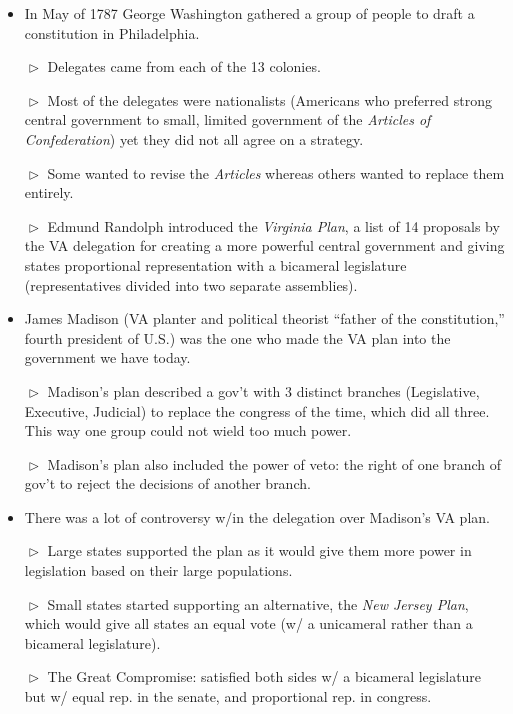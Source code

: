 \documentclass[10pt]{article}
\begin{document}
\begin{flushleft}

\begin{multicols}{2}

\begin{itemize}
\item In May of 1787 George Washington gathered a group of people to draft a constitution in Philadelphia.
\item[$\vartriangleright$] Delegates came from each of the 13 colonies.
\item[$\vartriangleright$] Most of the delegates were nationalists (Americans who preferred strong central government to small, limited government of the \textit{Articles of Confederation}) yet they did not all agree on a strategy.
\item[$\vartriangleright$] Some wanted to revise the \textit{Articles} whereas others wanted to replace them entirely.
\item[$\vartriangleright$] Edmund Randolph introduced the \textit{Virginia Plan}, a list of 14 proposals by the VA delegation for creating a more powerful central government and giving states proportional representation with a bicameral legislature (representatives divided into two separate assemblies).
\item James Madison (VA planter and political theorist ``father of the constitution,'' fourth president of U.S.) was the one who made the VA plan into the government we have today.
\item[$\vartriangleright$] Madison's plan described a gov't with 3 distinct branches (Legislative, Executive, Judicial) to replace the congress of the time, which did all three. This way one group could not wield too much power.
\item[$\vartriangleright$] Madison's plan also included the power of veto: the right of one branch of gov't to reject the decisions of another branch.
\item There was a lot of controversy w/in the delegation over Madison's VA plan.
\item[$\vartriangleright$] Large states supported the plan as it would give them more power in legislation based on their large populations.
\item[$\vartriangleright$] Small states started supporting an alternative, the \textit{New Jersey Plan}, which would give all states an equal vote (w/ a unicameral rather than a bicameral legislature).
\item[$\vartriangleright$] The Great Compromise: satisfied both sides w/ a bicameral legislature but w/ equal rep. in the senate, and proportional rep. in congress.

\end{itemize}
\end{multicols}
\end{flushleft}
\end{document}
